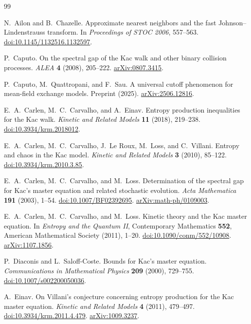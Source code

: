 \documentclass[11pt]{article}
\theoremstyle{definition}\newtheorem{definition}[theorem]{Definition}
\theoremstyle{remark}\newtheorem{remark}[theorem]{Remark}
\begin{document}
\begin{thebibliography}{99}
\raggedright
{} N.~Ailon and B.~Chazelle.
Approximate nearest neighbors and the fast Johnson--Lindenstrauss transform.
In \emph{Proceedings of STOC 2006}, 557--563.
\href{https://doi.org/10.1145/1132516.1132597}{doi:10.1145/1132516.1132597}.

 P.~Caputo.
On the spectral gap of the Kac walk and other binary collision processes.
\emph{ALEA} \textbf{4} (2008), 205--222.
\href{https://arxiv.org/abs/0807.3415}{arXiv:0807.3415}.

 P.~Caputo, M.~Quattropani, and F.~Sau.
A universal cutoff phenomenon for mean-field exchange models.
Preprint (2025). \href{https://arxiv.org/abs/2506.12816}{arXiv:2506.12816}.

 E.~A.~Carlen, M.~C.~Carvalho, and A.~Einav.
Entropy production inequalities for the Kac walk.
\emph{Kinetic and Related Models} \textbf{11} (2018), 219--238.
\href{https://doi.org/10.3934/krm.2018012}{doi:10.3934/krm.2018012}.

 E.~A.~Carlen, M.~C.~Carvalho, J.~Le Roux, M.~Loss, and C.~Villani.
Entropy and chaos in the Kac model.
\emph{Kinetic and Related Models} \textbf{3} (2010), 85--122.
\href{https://doi.org/10.3934/krm.2010.3.85}{doi:10.3934/krm.2010.3.85}.

 E.~A.~Carlen, M.~C.~Carvalho, and M.~Loss.
Determination of the spectral gap for Kac's master equation and related stochastic evolution.
\emph{Acta Mathematica} \textbf{191} (2003), 1--54.
\href{https://doi.org/10.1007/BF02392695}{doi:10.1007/BF02392695}.
\href{https://arxiv.org/abs/math-ph/0109003}{arXiv:math-ph/0109003}.

 E.~A.~Carlen, M.~C.~Carvalho, and M.~Loss.
Kinetic theory and the Kac master equation.
In \emph{Entropy and the Quantum II}, Contemporary Mathematics \textbf{552},
American Mathematical Society (2011), 1--20.
\href{https://doi.org/10.1090/conm/552/10908}{doi:10.1090/conm/552/10908}.
\href{https://arxiv.org/abs/1107.1856}{arXiv:1107.1856}.

 P.~Diaconis and L.~Saloff-Coste.
Bounds for Kac's master equation.
\emph{Communications in Mathematical Physics} \textbf{209} (2000), 729--755.
\href{https://doi.org/10.1007/s002200050036}{doi:10.1007/s002200050036}.

 A.~Einav.
On Villani's conjecture concerning entropy production for the Kac master equation.
\emph{Kinetic and Related Models} \textbf{4} (2011), 479--497.
\href{https://doi.org/10.3934/krm.2011.4.479}{doi:10.3934/krm.2011.4.479}.
\href{https://arxiv.org/abs/1009.3237}{arXiv:1009.3237}.


\end{thebibliography}
\end{document}
